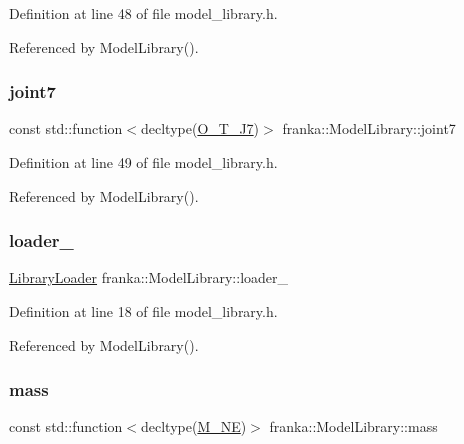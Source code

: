 Definition at line 48 of file model\+\_\+library.\+h.



Referenced by Model\+Library().

\mbox{\label{classfranka_1_1ModelLibrary_af2be813fd1fd1d91d0009993b4bd068a}} 
\subsubsection{\texorpdfstring{joint7}{joint7}}
{\footnotesize\ttfamily const std\+::function$<$decltype(\hyperlink{libfcimodels_8h_a2f154a8b8432c7a206ce0f1ffc5b4335}{O\+\_\+\+T\+\_\+\+J7})$>$ franka\+::\+Model\+Library\+::joint7}



Definition at line 49 of file model\+\_\+library.\+h.



Referenced by Model\+Library().

\mbox{\label{classfranka_1_1ModelLibrary_a77588a6e71629cfff0ff8b0c50ddc349}} 
\subsubsection{\texorpdfstring{loader\+\_\+}{loader\_}}
{\footnotesize\ttfamily \hyperlink{classfranka_1_1LibraryLoader}{Library\+Loader} franka\+::\+Model\+Library\+::loader\+\_\+\hspace{0.3cm}{\ttfamily [private]}}



Definition at line 18 of file model\+\_\+library.\+h.



Referenced by Model\+Library().

\mbox{\label{classfranka_1_1ModelLibrary_a8a7907f501b695b6ea001018d2c0f43a}} 
\subsubsection{\texorpdfstring{mass}{mass}}
{\footnotesize\ttfamily const std\+::function$<$decltype(\hyperlink{libfcimodels_8h_aba775689b8464577f47c500078e33f18}{M\+\_\+\+NE})$>$ franka\+::\+Model\+Library\+::mass}



